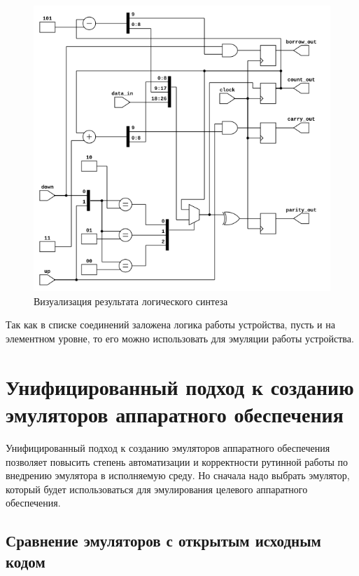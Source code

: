 \begin{figure}[!htbp]
    \centering
    \begin{adjustbox}{max totalsize={0.6\textwidth}{0.6\textheight}}
        \includegraphics[]{images/netlist.png}
    \end{adjustbox}
    \caption{Визуализация результата логического синтеза}\label{fig:emu-creation-pro}
\end{figure}


Так как в списке соединений заложена логика работы устройства, пусть и на элементном уровне,
то его можно использовать для эмуляции работы устройства.


\section{Унифицированный подход к созданию эмуляторов аппаратного обеспечения}\label{sec:ch1/sec4}

Унифицированный подход к созданию эмуляторов аппаратного обеспечения позволяет
повысить степень автоматизации и корректности рутинной работы по внедрению
эмулятора в исполняемую среду. Но сначала надо выбрать эмулятор, который
будет использоваться для эмулирования целевого аппаратного обеспечения.

\subsection{Сравнение эмуляторов с открытым исходным кодом}\label{sec:ch1/sec4/sub1}

